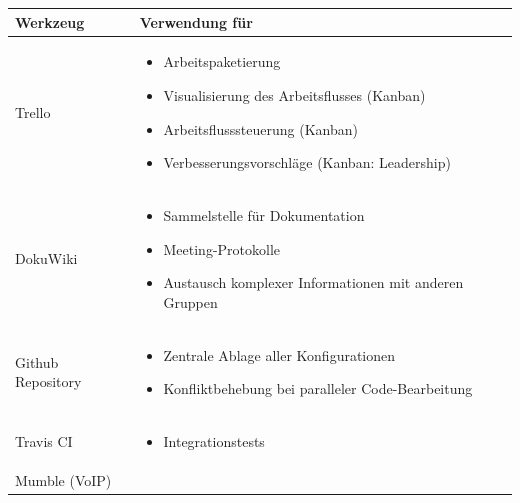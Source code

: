 \newpage
\begin{minipage}{\textwidth}
\begin{center}
\begin{tabular}{lp{12cm}}
\toprule
Werkzeug & Verwendung für \\
\midrule
Trello & 
  \begin{minipage}[t]{1\textwidth}
    \begin{itemize}
    \item Arbeitspaketierung
    \item Visualisierung des Arbeitsflusses (Kanban)
    \item Arbeitsflusssteuerung (Kanban)
    \item Verbesserungsvorschläge (Kanban: Leadership)
    \end{itemize}
  \end{minipage} \\
\midrule
DokuWiki & 
  \begin{minipage}[t]{1\textwidth}
    \begin{itemize}
    \item Sammelstelle für Dokumentation
    \item Meeting-Protokolle
    \item Austausch komplexer Informationen mit anderen Gruppen
    \end{itemize}
  \end{minipage}\\
\midrule
Github Repository & 
  \begin{minipage}[t]{1\textwidth}
    \begin{itemize}
    \item Zentrale Ablage aller Konfigurationen
    \item Konfliktbehebung bei paralleler Code-Bearbeitung
    \end{itemize}
  \end{minipage}\\
  \midrule
Travis CI & 
  \begin{minipage}[t]{1\textwidth}
    \begin{itemize}
    \item Integrationstests
    \end{itemize}
  \end{minipage}\\
  \midrule
Mumble (VoIP) & 
  \begin{minipage}[t]{1\textwidth}
    \begin{itemize}

\end{itemize}
\end{minipage}
\end{tabular}
\end{center}
\end{minipage}
